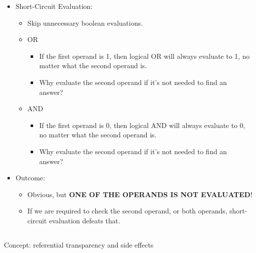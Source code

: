 \begin{itemize}[noitemsep]
\item Short-Circuit Evaluation:
  \begin{itemize}[noitemsep]
  \item Skip unnecessary boolean evaluations.
  \item OR
    \begin{itemize}[noitemsep]
    \item If the first operand is 1, then logical OR will always evaluate to 1, no matter what the second operand is.
    \item Why evaluate the second operand if it's not needed to find an answer?
    \end{itemize}
  \item AND
    \begin{itemize}[noitemsep]
    \item If the first operand is 0, then logical AND will always evaluate to 0, no matter what the second operand is.
    \item Why evaluate the second operand if it's not needed to find an answer?
    \end{itemize}
  \end{itemize}

\item Outcome:
  \begin{itemize}[noitemsep]
  \item Obvious, but \textbf{ONE OF THE OPERANDS IS NOT EVALUATED}!
  \item If we are required to check the second operand, or both operands, short-circuit evaluation defeats that.
  \end{itemize}
\end{itemize}

\subsection{}
Concept: referential transparency and side effects

